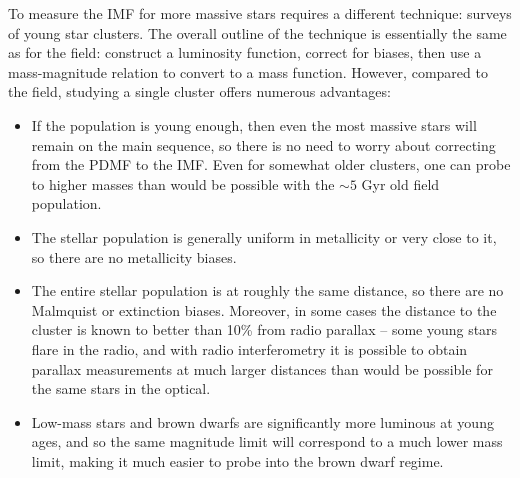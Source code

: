 To measure the IMF for more massive stars requires a different technique: surveys of young star clusters. The overall outline of the technique is essentially the same as for the field: construct a luminosity function, correct for biases, then use a mass-magnitude relation to convert to a mass function. However, compared to the field, studying a single cluster offers numerous advantages:
\begin{itemize}
\item If the population is young enough, then even the most massive stars will remain on the main sequence, so there is no need to worry about correcting from the PDMF to the IMF. Even for somewhat older clusters, one can probe to higher masses than would be possible with the $\sim 5$ Gyr old field population.
\item The stellar population is generally uniform in metallicity or very close to it, so there are no metallicity biases.
\item The entire stellar population is at roughly the same distance, so there are no Malmquist or extinction biases. Moreover, in some cases the distance to the cluster is known to better than 10\% from radio parallax -- some young stars flare in the radio, and with radio interferometry it is possible to obtain parallax measurements at much larger distances than would be possible for the same stars in the optical. 
\item Low-mass stars and brown dwarfs are significantly more luminous at young ages, and so the same magnitude limit will correspond to a much lower mass limit, making it much easier to probe into the brown dwarf regime.
\end{itemize}

